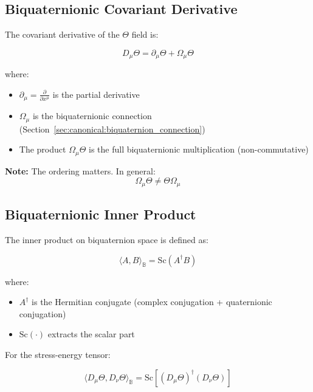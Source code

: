 \subsection{Biquaternionic Covariant Derivative}

The covariant derivative of the $\Theta$ field is:

\begin{equation}
\label{eq:canonical:biq_covariant_derivative}
\boxed{D_\mu \Theta = \partial_\mu \Theta + \Omega_\mu \Theta}
\end{equation}

\noindent where:
\begin{itemize}
    \item $\partial_\mu = \frac{\partial}{\partial x^\mu}$ is the partial derivative
    \item $\Omega_\mu$ is the biquaternionic connection (Section~\ref{sec:canonical:biquaternion_connection})
    \item The product $\Omega_\mu \Theta$ is the full biquaternionic multiplication (non-commutative)
\end{itemize}

\textbf{Note:} The ordering matters. In general:
\begin{equation}
\Omega_\mu \Theta \neq \Theta \Omega_\mu
\end{equation}

\subsection{Biquaternionic Inner Product}

The inner product on biquaternion space is defined as:

\begin{equation}
\label{eq:canonical:biq_inner_product}
\langle A, B \rangle_\mathbb{B} = \text{Sc}(A^\dagger B)
\end{equation}

where:
\begin{itemize}
    \item $A^\dagger$ is the Hermitian conjugate (complex conjugation + quaternionic conjugation)
    \item $\text{Sc}(\cdot)$ extracts the scalar part
\end{itemize}

For the stress-energy tensor:

\begin{equation}
\langle D_\mu \Theta, D_\nu \Theta \rangle_\mathbb{B} = \text{Sc}[(D_\mu \Theta)^\dagger (D_\nu \Theta)]
\end{equation}

